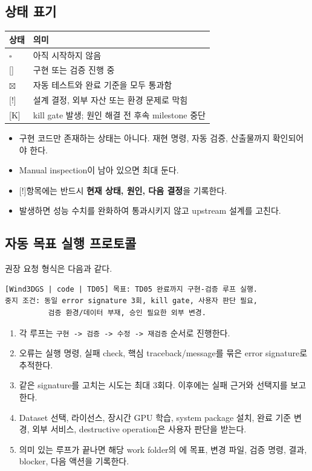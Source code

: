 \documentclass[10pt,a4paper]{article}
\newcommand{\todo}{\textcolor{TodoGray}{\(\square\)}}
\newcommand{\progress}{\textcolor{ProgressBlue}{[{\raisebox{0.1ex}{\(\sim\)}}]}}
\newcommand{\done}{\textcolor{DoneGreen}{\(\boxtimes\)}}
\newcommand{\blocked}{\textcolor{BlockRed}{[!]}}
\newcommand{\killmark}{\textcolor{KillRed}{[K]}}
\newcommand{\code}[1]{\texttt{#1}}
\begin{document}
\subsection{상태 표기}

\begin{center}
\begin{tabular}{@{}ll@{}}
\toprule
상태 & 의미 \\
\midrule
\todo & 아직 시작하지 않음 \\
\progress & 구현 또는 검증 진행 중 \\
\done & 자동 테스트와 완료 기준을 모두 통과함 \\
\blocked & 설계 결정, 외부 자산 또는 환경 문제로 막힘 \\
\killmark & kill gate 발생; 원인 해결 전 후속 milestone 중단 \\
\bottomrule
\end{tabular}
\end{center}

\begin{itemize}
  \item 구현 코드만 존재하는 상태는  아니다. 재현 명령, 자동 검증, 산출물까지 확인되어야 한다.
  \item Manual inspection이 남아 있으면 최대  둔다.
  \item \blocked 항목에는 반드시 \textbf{현재 상태, 원인, 다음 결정}을 기록한다.
  \item {} 발생하면 성능 수치를 완화하여 통과시키지 않고 upstream 설계를 고친다.
\end{itemize}

\subsection{자동 목표 실행 프로토콜}

권장 요청 형식은 다음과 같다.

\begin{lstlisting}
[Wind3DGS | code | TD05] 목표: TD05 완료까지 구현-검증 루프 실행.
중지 조건: 동일 error signature 3회, kill gate, 사용자 판단 필요,
          검증 환경/데이터 부재, 승인 필요한 외부 변경.
\end{lstlisting}

\begin{enumerate}
  \item 각 루프는 \code{구현 -> 검증 -> 수정 -> 재검증} 순서로 진행한다.
  \item 오류는 실행 명령, 실패 check, 핵심 traceback/message를 묶은 error signature로 추적한다.
  \item 같은 signature를 고치는 시도는 최대 3회다. 이후에는 실패 근거와 선택지를 보고한다.
  \item Dataset 선택, 라이선스, 장시간 GPU 학습, system package 설치, 완료 기준 변경,
  외부 서비스, destructive operation은 사용자 판단을 받는다.
  \item 의미 있는 루프가 끝나면 해당 work folder의 에
  목표, 변경 파일, 검증 명령, 결과, blocker, 다음 액션을 기록한다.
\end{enumerate}
\end{document}
